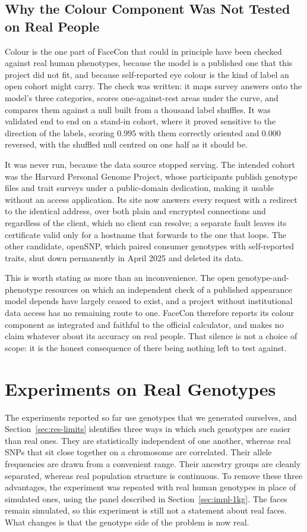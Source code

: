 \subsection{Why the Colour Component Was Not Tested on Real People}
\label{sec:res-appearance-untested}
Colour is the one part of FaceCon that could in principle have been checked against real human phenotypes, because the model is a published one that this project did not fit, and because self-reported eye colour is the kind of label an open cohort might carry. The check was written: it maps survey answers onto the model's three categories, scores one-against-rest areas under the curve, and compares them against a null built from a thousand label shuffles. It was validated end to end on a stand-in cohort, where it proved sensitive to the direction of the labels, scoring $0.995$ with them correctly oriented and $0.000$ reversed, with the shuffled null centred on one half as it should be.

It was never run, because the data source stopped serving. The intended cohort was the Harvard Personal Genome Project, whose participants publish genotype files and trait surveys under a public-domain dedication, making it usable without an access application. Its site now answers every request with a redirect to the identical address, over both plain and encrypted connections and regardless of the client, which no client can resolve; a separate fault leaves its certificate valid only for a hostname that forwards to the one that loops. The other candidate, openSNP, which paired consumer genotypes with self-reported traits, shut down permanently in April 2025 and deleted its data.

This is worth stating as more than an inconvenience. The open genotype-and-phenotype resources on which an independent check of a published appearance model depends have largely ceased to exist, and a project without institutional data access has no remaining route to one. FaceCon therefore reports its colour component as integrated and faithful to the official calculator, and makes no claim whatever about its accuracy on real people. That silence is not a choice of scope: it is the honest consequence of there being nothing left to test against.

\section{Experiments on Real Genotypes}
\label{sec:res-real}
The experiments reported so far use genotypes that we generated ourselves, and Section~\ref{sec:res-limits} identifies three ways in which such genotypes are easier than real ones. They are statistically independent of one another, whereas real SNPs that sit close together on a chromosome are correlated. Their allele frequencies are drawn from a convenient range. Their ancestry groups are cleanly separated, whereas real population structure is continuous. To remove these three advantages, the experiment was repeated with real human genotypes in place of simulated ones, using the panel described in Section~\ref{sec:impl-1kg}. The faces remain simulated, so this experiment is still not a statement about real faces. What changes is that the genotype side of the problem is now real.

